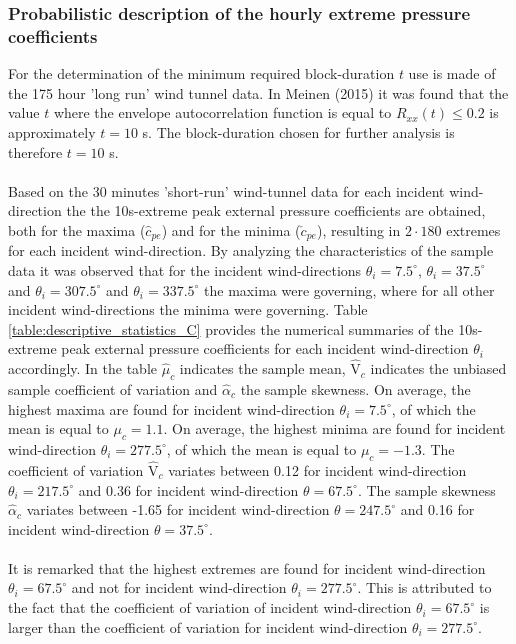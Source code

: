 \subsubsection{Probabilistic description of the hourly extreme pressure coefficients}
For the determination of the minimum required block-duration $t$ use is made of the 175 hour 'long run' wind tunnel data. In Meinen (2015) it was found that the value $t$ where the envelope autocorrelation function is equal to $R_{xx}(t)\leq0.2$ is approximately $t=10$ s. The block-duration chosen for further analysis is therefore $t=10$ s. \\
\\
Based on the 30 minutes 'short-run' wind-tunnel data for each incident wind-direction the the 10s-extreme peak external pressure coefficients are obtained, both for the maxima ($\hat{c}_{pe}$) and for the minima ($\check{c}_{pe}$), resulting in $2\cdot180$ extremes for each incident wind-direction. By analyzing the characteristics of the sample data it was observed that for the incident wind-directions
$\theta_i=7.5^{\circ}$, $\theta_i=37.5^{\circ}$ and $\theta_i=307.5^{\circ}$ and $\theta_i=337.5^{\circ}$ the maxima were governing, where for all other incident wind-directions the minima were governing. Table \ref{table:descriptive_statistics_C}                                                              provides the numerical summaries of the 10s-extreme peak external pressure coefficients for each incident wind-direction $\theta_i$ accordingly. In the table $\hat{\mu}_c$ indicates the sample mean, $\hat{\text{V}}_c$ indicates the unbiased sample coefficient of variation and $\hat{\alpha}_c$ the sample skewness. On average, the highest maxima are found for incident wind-direction $\theta_i=7.5^{\circ}$, of which the mean is equal to $\mu_{c}=1.1$. On average, the highest minima are found for incident wind-direction $\theta_i=277.5^{\circ}$, of which the mean is equal to $\mu_{c}=-1.3$. The coefficient of variation $\hat{\text{V}}_{c}$ variates between 0.12 for incident wind-direction $\theta_i=217.5^{\circ}$ and 0.36 for incident wind-direction $\theta=67.5^{\circ}$. The sample skewness $\hat{\alpha}_c$ variates between -1.65  for incident wind-direction $\theta=247.5^{\circ}$ and 0.16  for incident wind-direction $\theta=37.5^{\circ}$.  \\
\\
It is remarked that the highest extremes are found for incident wind-direction $\theta_i=67.5^{\circ}$ and not for incident wind-direction $\theta_i=277.5^{\circ}$. This is attributed to the fact that the coefficient of variation of incident wind-direction $\theta_i=67.5^{\circ}$ is larger than the coefficient of variation for incident wind-direction $\theta_i=277.5^{\circ}$. 



